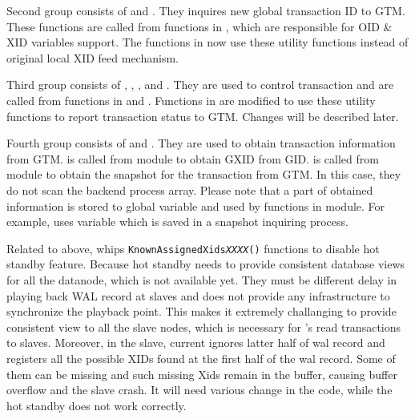   Second group consists of
   and .
  They inquires new global transaction ID to GTM.
  These functions are called from functions in , which are responsible for OID \& XID variables
  support.
  The functions in  now use these utility functions instead of
  original local XID feed mechanism.
  
  Third group consists of
  , , ,
   and .
  They are used to control transaction and are called from functions in  and .
  Functions in  are modified to use these utility functions
  to report transaction status to GTM.
  Changes will be described later.
  
  Fourth group consists of
   and .
  They are used to obtain transaction information from GTM.
   is called from  module to obtain GXID from GID.
   is called from  module to obtain the snapshot for the
  transaction from GTM.
  In this case, they do not scan the backend process array.
  Please note that a part of obtained information is stored to global variable and used by
  functions in  module.
  For example,  uses variable  which is saved in
  a snapshot inquiring process.
  
  Related to  above, \XC{} whips {\tt KnownAssignedXids{\it XXXX}()}
  functions to disable hot standby feature.
  Because hot standby needs to provide consistent database views for all the datanode,
  which is not available yet.
  They must be different delay in playing back WAL record at slaves and \PG{}
  does not provide any infrastructure to synchronize the playback point.
  This makes it extremely challanging to provide consistent view to all the slave nodes,
  which is necessary for \XC's read transactions to slaves.
  Moreover, in the slave, current  ignores latter half of
   wal record and registers all the possible XIDs found at
  the first half of the wal record.
  Some of them can be missing and such missing Xids remain in the buffer, causing buffer overflow and
  the slave crash.
  It will need various change in the code, while the hot standby does not work correctly.
  
